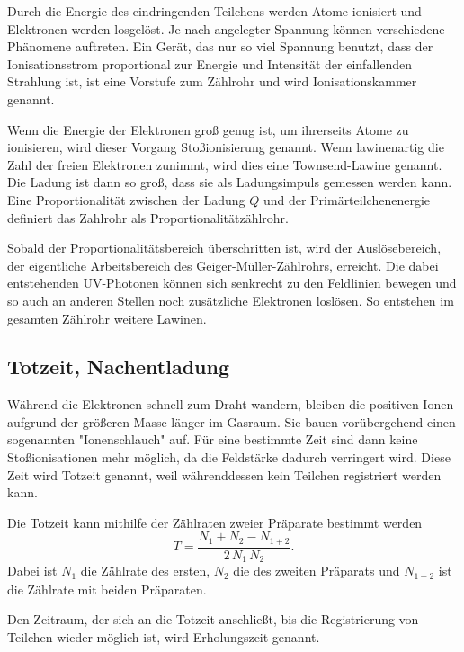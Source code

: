 \noindent Durch die Energie des eindringenden Teilchens werden Atome ionisiert und Elektronen werden losgelöst. Je nach angelegter Spannung können verschiedene Phänomene auftreten. Ein Gerät, das nur so viel Spannung benutzt, dass der Ionisationsstrom proportional zur Energie und Intensität der einfallenden Strahlung ist, ist eine Vorstufe zum Zählrohr und wird Ionisationskammer genannt. 

\noindent Wenn die Energie der Elektronen groß genug ist, um ihrerseits Atome zu ionisieren, wird dieser Vorgang Stoßionisierung genannt. Wenn lawinenartig die Zahl der freien Elektronen zunimmt, wird dies eine Townsend-Lawine genannt. 
Die Ladung ist dann so groß, dass sie als Ladungsimpuls gemessen werden kann.
Eine Proportionalität zwischen der Ladung $Q$ und der Primärteilchenenergie definiert das Zahlrohr als Proportionalitätzählrohr. 

\noindent Sobald der Proportionalitätsbereich überschritten ist, wird der Auslösebereich, der eigentliche Arbeitsbereich des Geiger-Müller-Zählrohrs, erreicht. Die dabei entstehenden UV-Photonen können sich senkrecht zu den Feldlinien bewegen und so auch an anderen Stellen noch zusätzliche Elektronen loslösen. So entstehen im gesamten Zählrohr weitere Lawinen. 

\subsection{Totzeit, Nachentladung}
Während die Elektronen schnell zum Draht wandern, bleiben die positiven Ionen aufgrund der größeren Masse länger im Gasraum. Sie bauen vorübergehend einen sogenannten "Ionenschlauch" auf. Für eine bestimmte Zeit sind dann keine Stoßionisationen mehr möglich, da die Feldstärke dadurch verringert wird. Diese Zeit wird Totzeit genannt, weil währenddessen kein Teilchen registriert werden kann.

\noindent Die Totzeit kann mithilfe der Zählraten zweier Präparate bestimmt werden
\begin{equation}
    T = \frac{N_1 + N_2 - N_{1+2}}{2 \, N_1 \, N_2}.
    \label{totzeit}
\end{equation}
Dabei ist $N_1$ die Zählrate des ersten, $N_2$ die des zweiten Präparats und $N_{1+2}$ ist die Zählrate mit beiden Präparaten.

\noindent Den Zeitraum, der sich an die Totzeit anschließt, bis die Registrierung von Teilchen wieder möglich ist, wird Erholungszeit genannt.

